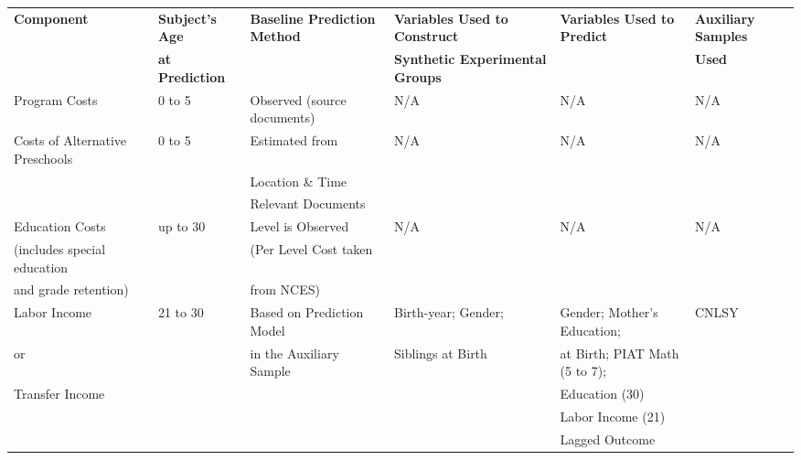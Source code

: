 \begin{tabular}{llllll} \toprule
    \textbf{Component} & \textbf{Subject's Age} & \textbf{Baseline Prediction Method} & \textbf{Variables Used to Construct}     & \textbf{Variables Used to Predict} & \textbf{Auxiliary Samples} \\
                    &   \textbf{at Prediction} &                                              & \textbf{Synthetic Experimental Groups}  &                                          & \textbf{Used}                         \\ \midrule
Program Costs             & 0 to 5      & Observed (source documents)      & N/A & N/A & N/A \\ \midrule
Costs of Alternative Preschools & 0 to 5      & Estimated from  & N/A & N/A & N/A \\
                           &                & Location \& Time & & & \\
                                    &                & Relevant Documents & & & \\ \midrule
Education Costs                       & up to 30  & Level is Observed                        & N/A & N/A & N/A \\
(includes special education     &                & (Per Level Cost taken             &       &        &        \\
and grade retention)                & & from NCES) & & & \\ \midrule

Labor Income       & 21 to 30 & Based on Prediction Model     & Birth-year; Gender;   & Gender; Mother's Education; & CNLSY \\
or                          &               & in the Auxiliary Sample            & Siblings at Birth     & at Birth; PIAT Math (5 to 7);   &              \\
Transfer Income   &               &                                                  &                             & Education (30)                       &              \\
                       &               &                                                  &                                   & Labor Income (21)                 &              \\
                       &               &                                                  &                                   & Lagged Outcome            &              \\ \midrule


\end{tabular}
